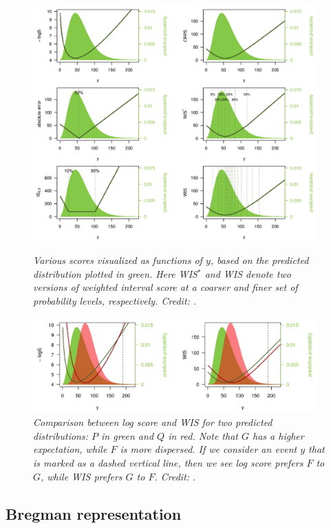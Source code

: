 \documentclass{article}
\begin{document}
\begin{figure}[p]
\centering
\includegraphics[width=0.975\textwidth]{scores1.png}
\caption{\it Various scores visualized as functions of $y$, based on the
  predicted distribution plotted in green. Here WIS$^*$ and WIS denote two
  versions of weighted interval score at a coarser and finer set of probability
  levels, respectively. Credit: \citet{bracher2021evaluating}.}       
\label{fig:scores1}   

\bigskip\medskip

\includegraphics[width=0.975\textwidth]{scores2.png}
\caption{\it Comparison between log score and WIS for two predicted
  distributions: $P$ in green and $Q$ in red. Note that $G$ has a higher
  expectation, while $F$ is more dispersed. If we consider an event $y$ that is
  marked as a dashed vertical line, then we see log score prefers $F$ to $G$,
  while WIS prefers $G$ to $F$. Credit: \citet{bracher2021evaluating}.}           
\label{fig:scores2}
\end{figure}

\subsection{Bregman representation}
\label{sec:bregman_rep}
\end{document}
